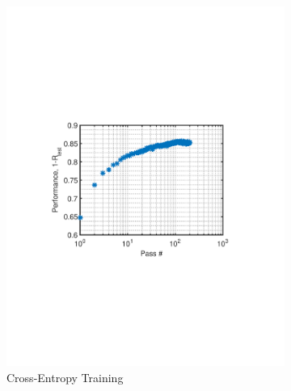 \documentclass[journal,a4paper,onecolumn,11pt]{IEEEtran}
\begin{document}
\begin{figure}[!h]
\begin{subfigure}{.5\textwidth}
			\includegraphics[clip, trim=0cm .25cm 0cm .5cm, width=\textwidth]{performance_fnt_ce_200run.pdf}
		\caption{Cross-Entropy Training}
		\label{fig:performance_fnt_ce_200run}
	\end{subfigure}
	\begin{subfigure}{.5\textwidth}
		\centering

\end{subfigure}
\end{figure}
\end{document}
